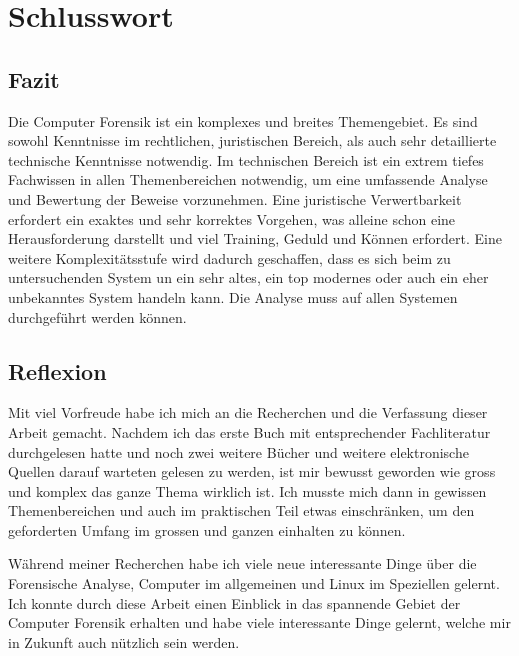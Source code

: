 \chapter{Schlusswort}

\section{Fazit}
Die Computer Forensik ist ein komplexes und breites Themengebiet. Es sind sowohl Kenntnisse im rechtlichen, juristischen Bereich, als auch sehr detaillierte technische Kenntnisse notwendig. Im technischen Bereich ist ein extrem tiefes Fachwissen in allen Themenbereichen notwendig, um eine umfassende Analyse und Bewertung der Beweise vorzunehmen. Eine juristische Verwertbarkeit erfordert ein exaktes und sehr korrektes Vorgehen, was alleine schon eine Herausforderung darstellt und viel Training, Geduld und Können erfordert. Eine weitere Komplexitätsstufe wird dadurch geschaffen, dass es sich beim zu untersuchenden System un ein sehr altes, ein top modernes oder auch ein eher unbekanntes System handeln kann. Die Analyse muss auf allen Systemen durchgeführt werden können.

\section{Reflexion}
Mit viel Vorfreude habe ich mich an die Recherchen und die Verfassung dieser Arbeit gemacht. Nachdem ich das erste Buch mit entsprechender Fachliteratur durchgelesen hatte und noch zwei weitere Bücher und weitere elektronische Quellen darauf warteten gelesen zu werden, ist mir bewusst geworden wie gross und komplex das ganze Thema wirklich ist. Ich musste mich dann in gewissen Themenbereichen und auch im praktischen Teil etwas einschränken, um den geforderten Umfang im grossen und ganzen einhalten zu können.

Während meiner Recherchen habe ich viele neue interessante Dinge über die Forensische Analyse, Computer im allgemeinen und Linux im Speziellen gelernt. Ich konnte durch diese Arbeit einen Einblick in das spannende Gebiet der Computer Forensik erhalten und habe viele interessante Dinge gelernt, welche mir in Zukunft auch nützlich sein werden.